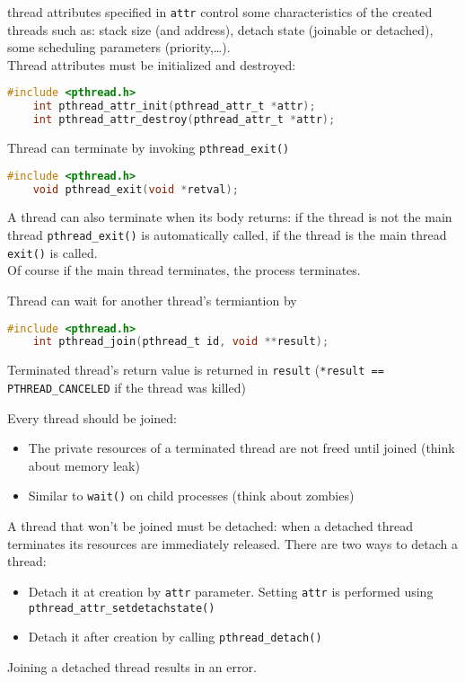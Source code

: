 thread attributes specified in \texttt{attr} control some characteristics of the created threads such as: stack size (and address), detach state (joinable or detached), some scheduling parameters (priority,\dots).\\
Thread attributes must be initialized and destroyed:
\begin{lstlisting}[language=C]
    #include <pthread.h>
    int pthread_attr_init(pthread_attr_t *attr);
    int pthread_attr_destroy(pthread_attr_t *attr);
\end{lstlisting}


Thread can terminate by invoking \texttt{pthread\_exit()}
\begin{lstlisting}[language=C]
    #include <pthread.h>
    void pthread_exit(void *retval);
\end{lstlisting}
A thread can also terminate when its body returns: if the thread is not the main thread \texttt{pthread\_exit()} is automatically called, if the thread is the main thread \texttt{exit()} is called.\\
Of course if the main thread terminates, the process terminates.

Thread can wait for another thread's termiantion by
\begin{lstlisting}[language=C]
    #include <pthread.h>
    int pthread_join(pthread_t id, void **result);
\end{lstlisting}
Terminated thread's return value is returned in \texttt{result} (\texttt{*result == PTHREAD\_CANCELED} if the thread was killed)

Every thread should be joined:
\begin{itemize}
    \item The private resources of a terminated thread are not freed until joined (think about memory leak)
    \item Similar to \texttt{wait()} on child processes (think about zombies)
\end{itemize}

A thread that won't be joined must be detached: when a detached thread terminates its resources are immediately released.
There are two ways to detach a thread:
\begin{itemize}
    \item Detach it at creation by \texttt{attr} parameter. Setting \texttt{attr} is performed using \texttt{pthread\_attr\_setdetachstate()}
    \item Detach it after creation by calling \texttt{pthread\_detach()}
\end{itemize}
Joining a detached thread results in an error.

